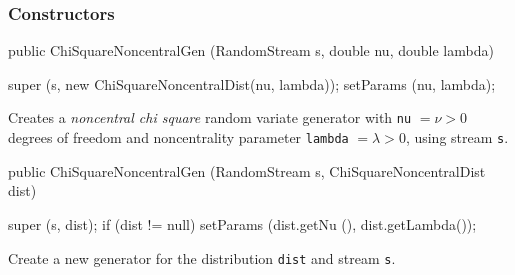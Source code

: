 \subsubsection* {Constructors}
\begin{code}

   public ChiSquareNoncentralGen (RandomStream s, double nu, double lambda) \begin{hide} {
      super (s, new ChiSquareNoncentralDist(nu, lambda));
      setParams (nu, lambda);
   }\end{hide}
\end{code}
\begin{tabb}  Creates a \emph{noncentral chi square}  random variate generator
 with \texttt{nu} $=\nu>0$ degrees of freedom and noncentrality parameter 
\texttt{lambda} $= \lambda>0$,
 using stream \texttt{s}.
\end{tabb}
\begin{code}

   public ChiSquareNoncentralGen (RandomStream s,
                                  ChiSquareNoncentralDist dist) \begin{hide} {
      super (s, dist);
      if (dist != null)
         setParams (dist.getNu (), dist.getLambda());
   }\end{hide}
\end{code}
\begin{tabb}  Create a new generator for the distribution \texttt{dist}
    and stream \texttt{s}.
\end{tabb}

